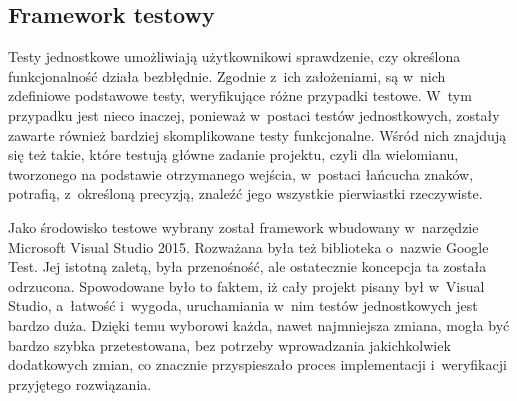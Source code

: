 \subsection{Framework testowy}
Testy jednostkowe umożliwiają użytkownikowi sprawdzenie, czy określona funkcjonalność działa bezbłędnie. Zgodnie z~ich założeniami, są w~nich zdefiniowe podstawowe testy, weryfikujące różne przypadki testowe. W~tym przypadku jest nieco inaczej, ponieważ w~postaci testów jednostkowych, zostały zawarte również bardziej skomplikowane testy funkcjonalne. Wśród nich znajdują się też takie, które testują główne zadanie projektu, czyli dla wielomianu, tworzonego na podstawie otrzymanego wejścia, w~postaci łańcucha znaków, potrafią, z~określoną precyzją, znaleźć jego wszystkie pierwiastki rzeczywiste.

Jako środowisko testowe wybrany został framework wbudowany w~narzędzie Microsoft Visual Studio 2015. Rozważana była też biblioteka o~nazwie Google Test. Jej istotną zaletą, była przenośność, ale ostatecznie koncepcja ta została odrzucona. Spowodowane było to faktem, iż cały projekt pisany był w~Visual Studio, a~łatwość i~wygoda, uruchamiania w~nim testów jednostkowych jest bardzo duża. Dzięki temu wyborowi każda, nawet najmniejsza zmiana, mogła być bardzo szybka przetestowana, bez potrzeby wprowadzania jakichkolwiek dodatkowych zmian, co znacznie przyspieszało proces implementacji i~weryfikacji przyjętego rozwiązania.